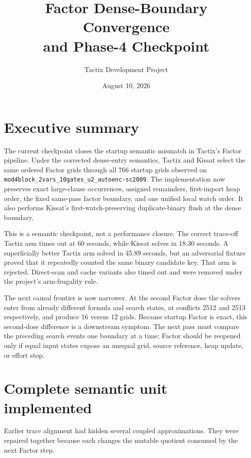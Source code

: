 \documentclass[11pt]{article}
\title{Factor Dense-Boundary Convergence\\and Phase-4 Checkpoint}
\author{Tactix Development Project}
\date{August 10, 2026}
\newcommand{\code}[1]{\nolinkurl{#1}}
\newcommand{\tactix}{Tactix}
\newcommand{\kissat}{Kissat}
\begin{document}
\maketitle
\sloppy

\section*{Executive summary}

The current checkpoint closes the startup semantic mismatch in \tactix{}'s
Factor pipeline.  Under the corrected dense-entry semantics, \tactix{} and
\kissat{} select the same ordered Factor grids through all 766 startup grids
observed on
\code{mod4block_2vars_10gates_u2_autoenc-sc2009}.  The implementation now
preserves exact large-clause occurrences, assigned remainders, first-import
heap order, the fixed same-pass factor boundary, and one unified local watch
order.  It also performs \kissat{}'s first-watch-preserving duplicate-binary
flush at the dense boundary.

This is a semantic checkpoint, not a performance closure.  The correct
trace-off \tactix{} arm times out at 60 seconds, while \kissat{} solves in
18.30 seconds.  A superficially better \tactix{} arm solved in 45.89 seconds,
but an adversarial fixture proved that it repeatedly counted the same binary
candidate key.  That arm is rejected.  Direct-scan and cache variants also
timed out and were removed under the project's arm-frugality rule.

The next causal frontier is now narrower.  At the second Factor dose the
solvers enter from already different formula and search states, at conflicts
2512 and 2513 respectively, and produce 16 versus 12 grids.  Because startup
Factor is exact, this second-dose difference is a downstream symptom.  The
next pass must compare the preceding search events one boundary at a time;
Factor should be reopened only if equal input states expose an unequal
grid, source reference, heap update, or effort stop.

\section{Complete semantic unit implemented}

Earlier trace alignment had hidden several coupled approximations.  They were
repaired together because each changes the mutable quotient consumed by the
next Factor step.
\end{document}
